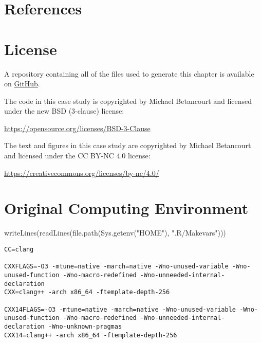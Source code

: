 \documentclass[
  letterpaper,
  DIV=11,
  numbers=noendperiod]{scrartcl}
\newenvironment{Shaded}{\begin{snugshade}}{\end{snugshade}}
\newcommand{\FunctionTok}[1]{\textcolor[rgb]{0.28,0.35,0.67}{#1}}
\newcommand{\NormalTok}[1]{\textcolor[rgb]{0.00,0.23,0.31}{#1}}
\newcommand{\StringTok}[1]{\textcolor[rgb]{0.13,0.47,0.30}{#1}}
\begin{document}
\section*{References}\label{references}

\section*{License}\label{license}

A repository containing all of the files used to generate this chapter
is available on
\href{https://github.com/betanalpha/quarto_chapters/tree/main/case_studies/die_fairness}{GitHub}.

The code in this case study is copyrighted by Michael Betancourt and
licensed under the new BSD (3-clause) license:

\url{https://opensource.org/licenses/BSD-3-Clause}

The text and figures in this case study are copyrighted by Michael
Betancourt and licensed under the CC BY-NC 4.0 license:

\url{https://creativecommons.org/licenses/by-nc/4.0/}

\section*{Original Computing
Environment}\label{original-computing-environment}

\begin{Shaded}
\begin{Highlighting}[]
\FunctionTok{writeLines}\NormalTok{(}\FunctionTok{readLines}\NormalTok{(}\FunctionTok{file.path}\NormalTok{(}\FunctionTok{Sys.getenv}\NormalTok{(}\StringTok{"HOME"}\NormalTok{), }\StringTok{".R/Makevars"}\NormalTok{)))}
\end{Highlighting}
\end{Shaded}

\begin{verbatim}
CC=clang

CXXFLAGS=-O3 -mtune=native -march=native -Wno-unused-variable -Wno-unused-function -Wno-macro-redefined -Wno-unneeded-internal-declaration
CXX=clang++ -arch x86_64 -ftemplate-depth-256

CXX14FLAGS=-O3 -mtune=native -march=native -Wno-unused-variable -Wno-unused-function -Wno-macro-redefined -Wno-unneeded-internal-declaration -Wno-unknown-pragmas
CXX14=clang++ -arch x86_64 -ftemplate-depth-256
\end{verbatim}
\end{document}
